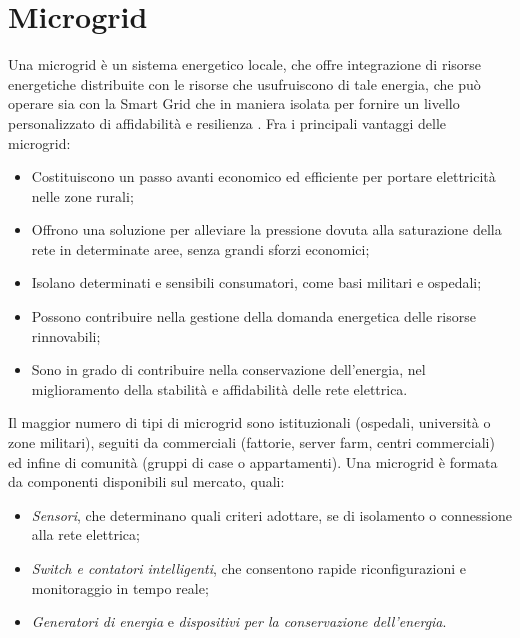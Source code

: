 \section{Microgrid}
Una microgrid è un sistema energetico locale, che offre integrazione di risorse energetiche    distribuite con le risorse che usufruiscono di tale energia, che può operare sia con la Smart Grid che in maniera isolata per fornire un livello personalizzato di affidabilità e resilienza \cite{smartgrid}. 
Fra i principali vantaggi delle microgrid:
\begin{itemize}
	\item Costituiscono un passo avanti economico ed efficiente per portare elettricità nelle zone rurali;
	\item Offrono una soluzione per alleviare la pressione dovuta alla saturazione della rete in determinate aree, senza grandi sforzi economici;
	\item Isolano determinati e sensibili consumatori, come basi militari e ospedali;
	\item Possono contribuire nella gestione della domanda energetica delle risorse rinnovabili;
	\item Sono in grado di contribuire nella conservazione dell'energia, nel miglioramento della stabilità e affidabilità delle rete elettrica.	  
\end{itemize}
Il maggior numero di tipi di microgrid sono istituzionali (ospedali, università o zone militari), seguiti da commerciali (fattorie, server farm, centri commerciali) ed infine di comunità (gruppi di case o appartamenti).  
Una microgrid è formata da componenti disponibili sul mercato, quali:
\begin{itemize}
	\item \emph{Sensori}, che determinano quali criteri adottare, se di isolamento o connessione alla rete elettrica;
	\item \emph{Switch e contatori intelligenti}, che consentono rapide riconfigurazioni e monitoraggio in tempo reale;
	\item \emph{Generatori di energia} e \emph{dispositivi per la conservazione dell'energia}.   
\end{itemize}

